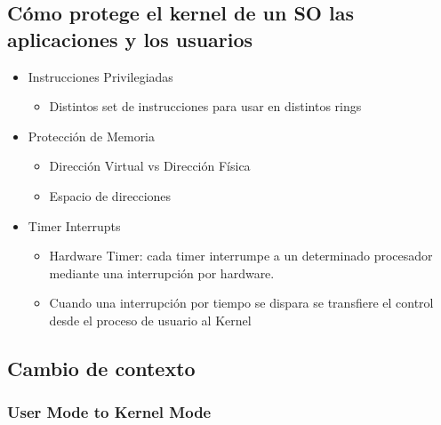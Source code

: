 \documentclass{article}
\begin{document}
\subsection{Cómo protege el kernel de un SO las aplicaciones y los
usuarios}\label{cuxf3mo-protege-el-kernel-de-un-so-las-aplicaciones-y-los-usuarios}

\begin{itemize}
\item
  Instrucciones Privilegiadas

  \begin{itemize}
  \item
    Distintos set de instrucciones para usar en distintos rings
  \end{itemize}
\item
  Protección de Memoria

  \begin{itemize}
  \item
    Dirección Virtual vs Dirección Física
  \item
    Espacio de direcciones
  \end{itemize}
\item
  Timer Interrupts

  \begin{itemize}
  \item
    Hardware Timer: cada timer interrumpe a un determinado procesador
    mediante una interrupción por hardware.
  \item
    Cuando una interrupción por tiempo se dispara se transfiere el
    control desde el proceso de usuario al Kernel
  \end{itemize}
\end{itemize}

\subsection{Cambio de contexto}\label{cambio-de-contexto}

\subsubsection{User Mode to Kernel Mode}\label{user-mode-to-kernel-mode}
\end{document}
